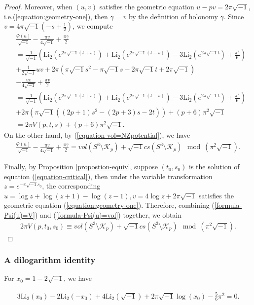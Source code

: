 \documentclass[12pt]{amsart}
\begin{document}
\begin{proof}
Moreover, when $(u,v)$ satisfies the geometric equation $u-pv=2\pi\sqrt{-1}$, i.e.(\ref{equation:geometry-one}), then $\gamma=v$ by the definition of holonomy $\gamma$. Since $v=4\pi\sqrt{-1}(-s+\frac{1}{2})$, we compute 
\begin{align}  \label{formula-Psi(u)=V}
     &\frac{\Phi(u)}{\sqrt{-1}}-\frac{uv}{4\sqrt{-1}}+\frac{\pi \gamma}{2}\\\nonumber
     &=\frac{1}{\sqrt{-1}}\left(\text{Li}_2(e^{2\pi\sqrt{-1}(t+s)})+\text{Li}_2(e^{2\pi\sqrt{-1}(t-s)})-3\text{Li}_2(e^{2\pi\sqrt{-1}t})+\frac{\pi^2}{6}\right)\\\nonumber
    &+\frac{1}{2\sqrt{-1}}uv+2\pi(\pi\sqrt{-1}s^2-\pi\sqrt{-1}s-2\pi\sqrt{-1}t+2\pi\sqrt{-1})\\\nonumber
    &-\frac{uv}{4\sqrt{-1}}+\frac{\pi v}{2}\\\nonumber
    &=\frac{1}{\sqrt{-1}}\left(\text{Li}_2(e^{2\pi\sqrt{-1}(t+s)})+\text{Li}_2(e^{2\pi\sqrt{-1}(t-s)})-3\text{Li}_2(e^{2\pi\sqrt{-1}t})+\frac{\pi^2}{6}\right)\\\nonumber
    &+2\pi\left(\pi\sqrt{-1}((2p+1)s^2-(2p+3)s-2t)\right)+(p+6)\pi^2\sqrt{-1}\\\nonumber
    &=2\pi V(p,t,s)+(p+6)\pi^2\sqrt{-1}.
\end{align}
On the other hand, by (\ref{equation-vol=NZpotential}),  we have
\begin{align} \label{formula-Psi(u)=vol}
    \frac{\Phi(u)}{\sqrt{-1}}-\frac{uv}{4\sqrt{-1}}+\frac{\pi \gamma}{2}=vol(S^3\setminus\mathcal{K}_p)+\sqrt{-1}cs(S^3\setminus\mathcal{K}_p) \mod (\pi^2 \sqrt{-1}).
\end{align}


Finally, by Proposition \ref{propostion-equiv}, suppose $(t_0,s_0)$ is the solution of equation (\ref{equation-critical}), then under the variable transformation $z=e^{-\pi\sqrt{-1}s_0}$,  the corresponding $u=\log z+\log(z+1)-\log(z-1),v=4\log z+2\pi\sqrt{-1}$ satisfies the geometric equation (\ref{equation:geometry-one}). Therefore, combining  (\ref{formula-Psi(u)=V}) and (\ref{formula-Psi(u)=vol}) together, we obtain
\begin{align}
    2\pi V(p,t_0,s_0)\equiv vol(S^3\setminus\mathcal{K}_p)+\sqrt{-1}cs(S^3\setminus\mathcal{K}_p) \mod (\pi^2 \sqrt{-1}).
\end{align}
\end{proof}

\subsubsection{A dilogarithm identity}
\begin{lemma} \label{lemma-dilogidentity}
For $x_0=1-2\sqrt{-1}$, we have

\begin{align}
  3\text{Li}_2(x_0)-2\text{Li}_2(-x_0)+4\text{Li}_2(\sqrt{-1})+2\pi\sqrt{-1}\log(x_0)-\frac{5}{6}\pi^2=0.  
\end{align}
\end{lemma}
\end{document}

